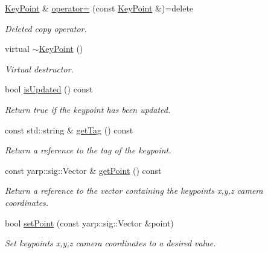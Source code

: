 \begin{DoxyCompactItemize}
\mbox{\hyperlink{classassistive__rehab_1_1KeyPoint}{Key\+Point}} \& \mbox{\hyperlink{classassistive__rehab_1_1KeyPoint_aecdf117e438bedb51734c7d2730e6d61}{operator=}} (const \mbox{\hyperlink{classassistive__rehab_1_1KeyPoint}{Key\+Point}} \&)=delete
\begin{DoxyCompactList}\small\item\em Deleted copy operator. \end{DoxyCompactList}\item 
\mbox{\label{classassistive__rehab_1_1KeyPoint_a5c959f932cbdc1cd4f326aef56a8e66b}} 
virtual \mbox{\hyperlink{classassistive__rehab_1_1KeyPoint_a5c959f932cbdc1cd4f326aef56a8e66b}{$\sim$\+Key\+Point}} ()
\begin{DoxyCompactList}\small\item\em Virtual destructor. \end{DoxyCompactList}\item 
bool \mbox{\hyperlink{classassistive__rehab_1_1KeyPoint_ab1c339fe8a6dd281534d54bb0fdb3c50}{is\+Updated}} () const
\begin{DoxyCompactList}\small\item\em Return true if the keypoint has been updated. \end{DoxyCompactList}\item 
const std\+::string \& \mbox{\hyperlink{classassistive__rehab_1_1KeyPoint_ace24db46297c42bee32acd87d7450dcd}{get\+Tag}} () const
\begin{DoxyCompactList}\small\item\em Return a reference to the tag of the keypoint. \end{DoxyCompactList}\item 
const yarp\+::sig\+::\+Vector \& \mbox{\hyperlink{classassistive__rehab_1_1KeyPoint_a4d68e0824d66f6f0db6dbc176eec3930}{get\+Point}} () const
\begin{DoxyCompactList}\small\item\em Return a reference to the vector containing the keypoint\textquotesingle{}s x,y,z camera coordinates. \end{DoxyCompactList}\item 
bool \mbox{\hyperlink{classassistive__rehab_1_1KeyPoint_a6430d1d6b7704a85462de39b6962e48b}{set\+Point}} (const yarp\+::sig\+::\+Vector \&point)
\begin{DoxyCompactList}\small\item\em Set keypoint\textquotesingle{}s x,y,z camera coordinates to a desired value. \end{DoxyCompactList}\item 

\end{DoxyCompactItemize}
